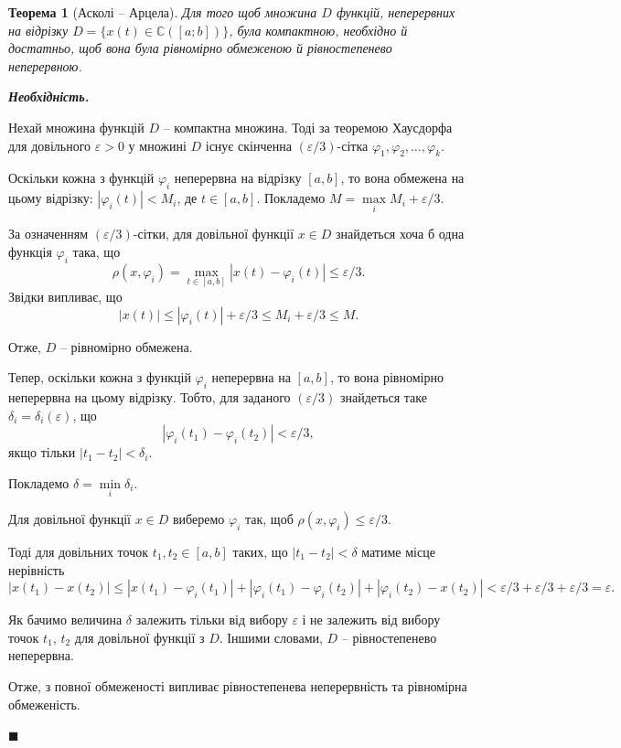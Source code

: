 \documentclass[14pt,twoside]{extreport}
\theoremstyle{mystyle}
\newtheorem{thm}{Теорема}
\renewenvironment{proof}{{\bfseries Доведення.}}{$\blacksquare$}
\numberwithin{equation}{chapter}
\newcommand{\cab}{\mathbb{C}([a; b])}
\begin{document}
\begin{thm}[Асколі -- Арцела]
Для того щоб множина $D$ функцій, неперервних на відрізку $D=\{x(t) \in \cab\}$, була компактною, необхідно й достатньо, щоб вона була рівномірно обмеженою й рівностепенево неперервною.
\end{thm}

\begin{proof}

\emph{\textbf{Необхідність.}}

Нехай множина функцій $D$ -- компактна множина. Тоді за теоремою Хаусдорфа для довільного $\varepsilon>0$ у множині $D$ існує скінченна $(\varepsilon/3)$-сітка $\varphi_1, \varphi_2,\ldots,\varphi_k$.

Оскільки кожна з функцій $\varphi_i$ неперервна на відрізку $[a,b]$, то вона обмежена на цьому відрізку: $|\varphi_i(t)|<M_i$, де $t\in[a,b]$. Покладемо $M=\max\limits_{i} M_i+\varepsilon/3$.

За означенням $(\varepsilon/3)$-сітки, для довільної функції $x\in D$ знайдеться хоча б одна функція $\varphi_i$ така, що
\[\rho(x,\varphi_i)=\max\limits_{t\in[a,b]}|x(t)-\varphi_i(t)|\leqslant\varepsilon/3.\]
Звідки випливає, що
\[|x(t)|\leqslant|\varphi_i(t)|+\varepsilon/3\leqslant M_i+\varepsilon/3\leqslant M.\]

Отже, $D$ -- рівномірно обмежена.

Тепер, оскільки кожна з функцій $\varphi_i$ неперервна на $[a,b]$, то вона рівномірно неперервна на цьому відрізку. Тобто, для заданого $(\varepsilon/3)$ знайдеться таке $\delta_i=\delta_i(\varepsilon)$, що \[|\varphi_i(t_1)-\varphi_i(t_2)|<\varepsilon/3,\]
якщо тільки $|t_1 - t_2|<\delta_i$.

Покладемо $\delta=\min\limits_{i}\delta_i$.

Для довільної функції $x\in D$ виберемо $\varphi_i$ так, щоб $\rho(x,\varphi_i)\leqslant\varepsilon/3$.

Тоді для довільних точок $t_1, t_2\in[a,b]$ таких, що $|t_1-t_2|<\delta$ матиме місце нерівність
\[|x(t_1)-x(t_2)|\leqslant |x(t_1)-\varphi_i(t_1)|+|\varphi_i(t_1)-\varphi_i(t_2)|+|\varphi_i(t_2)-x(t_2)|<\varepsilon/3+\varepsilon/3+\varepsilon/3=\varepsilon.\]

Як бачимо величина $\delta$ залежить тільки від вибору $\varepsilon$ і не залежить від вибору точок $t_1$, $t_2$ для довільної функції з $D$. Іншими словами, $D$ -- рівностепенево неперервна.

Отже, з повної обмеженості випливає рівностепенева неперервність та рівномірна обмеженість.


\end{proof}
\end{document}
